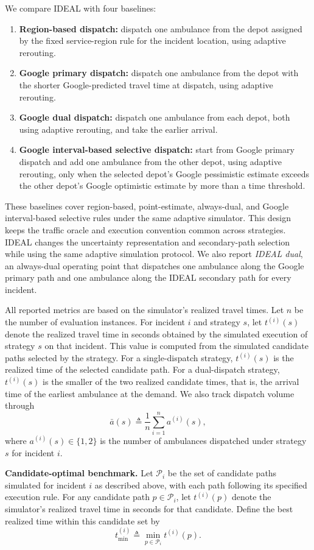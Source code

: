 \documentclass[11pt, letterpaper, oneside, reqno]{amsart}
\newcommand{\Let}{\triangleq}
\begin{document}
We compare IDEAL with four baselines:
\begin{enumerate}[leftmargin=7mm]
\item \textbf{Region-based dispatch:} dispatch one ambulance from the depot assigned by the fixed service-region rule for the incident location, using adaptive rerouting.
\item \textbf{Google primary dispatch:} dispatch one ambulance from the depot with the shorter Google-predicted travel time at dispatch, using adaptive rerouting.
\item \textbf{Google dual dispatch:} dispatch one ambulance from each depot, both using adaptive rerouting, and take the earlier arrival.
\item \textbf{Google interval-based selective dispatch:} start from Google primary dispatch and add one ambulance from the other depot, using adaptive rerouting, only when the selected depot's Google pessimistic estimate exceeds the other depot's Google optimistic estimate by more than a time threshold.
\end{enumerate}
These baselines cover region-based, point-estimate, always-dual, and Google interval-based selective rules under the same adaptive simulator. This design keeps the traffic oracle and execution convention common across strategies. IDEAL changes the uncertainty representation and secondary-path selection while using the same adaptive simulation protocol. We also report \textit{IDEAL dual}, an always-dual operating point that dispatches one ambulance along the Google primary path and one ambulance along the IDEAL secondary path for every incident.

All reported metrics are based on the simulator's realized travel times. Let $n$ be the number of evaluation instances. For incident $i$ and strategy $s$, let $t^{(i)}(s)$ denote the realized travel time in seconds obtained by the simulated execution of strategy $s$ on that incident. This value is computed from the simulated candidate paths selected by the strategy. For a single-dispatch strategy, $t^{(i)}(s)$ is the realized time of the selected candidate path. For a dual-dispatch strategy, $t^{(i)}(s)$ is the smaller of the two realized candidate times, that is, the arrival time of the earliest ambulance at the demand. We also track dispatch volume through
\[
\bar a(s) \Let \frac{1}{n}\sum_{i=1}^n a^{(i)}(s),
\]
where $a^{(i)}(s)\in\{1,2\}$ is the number of ambulances dispatched under strategy $s$ for incident $i$.

\noindent\textbf{Candidate-optimal benchmark.}
Let $\mathcal P_i$ be the set of candidate paths simulated for incident $i$ as described above, with each path following its specified execution rule. For any candidate path $p\in\mathcal P_i$, let $t^{(i)}(p)$ denote the simulator's realized travel time in seconds for that candidate. Define the best realized time within this candidate set by
\[
t^{(i)}_{\min} \Let \min_{p\in\mathcal P_i} t^{(i)}(p).
\]
\end{document}
